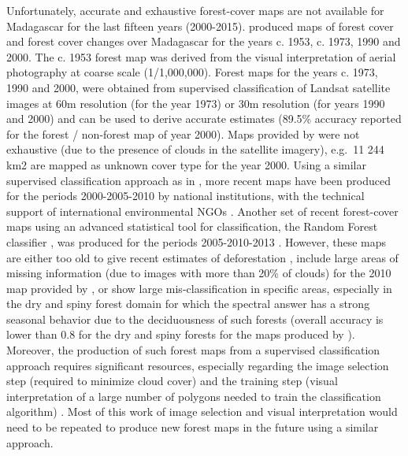 \documentclass[]{article}
\begin{document}
Unfortunately, accurate and exhaustive forest-cover maps are not
available for Madagascar for the last fifteen years (2000-2015).
\citet{Harper2007} produced maps of forest cover and forest cover
changes over Madagascar for the years c. 1953, c. 1973, 1990 and 2000.
The c. 1953 forest map was derived from the visual interpretation of
aerial photography at coarse scale (1/1,000,000). Forest maps for the
years c. 1973, 1990 and 2000, were obtained from supervised
classification of Landsat satellite images at 60m resolution (for the
year 1973) or 30m resolution (for years 1990 and 2000) and can be used
to derive accurate estimates (89.5\% accuracy reported for the forest /
non-forest map of year 2000). Maps provided by \citet{Harper2007} were
not exhaustive (due to the presence of clouds in the satellite imagery),
e.g.~11 244 km2 are mapped as unknown cover type for the year 2000.
Using a similar supervised classification approach as in
\citet{Harper2007}, more recent maps have been produced for the periods
2000-2005-2010 by national institutions, with the technical support of
international environmental NGOs \citep{MEFT2009, ONE2013}. Another set
of recent forest-cover maps using an advanced statistical tool for
classification, the Random Forest classifier
\citep{Grinand2013, Rakotomalala2015}, was produced for the periods
2005-2010-2013 \citep{ONE2015}. However, these maps are either too old
to give recent estimates of deforestation \citep{MEFT2009, ONE2013},
include large areas of missing information (due to images with more than
20\% of clouds) for the 2010 map provided by \citep{ONE2013}, or show
large mis-classification in specific areas, especially in the dry and
spiny forest domain for which the spectral answer has a strong seasonal
behavior due to the deciduousness of such forests (overall accuracy is
lower than 0.8 for the dry and spiny forests for the maps produced by
\citet{ONE2015}). Moreover, the production of such forest maps from a
supervised classification approach requires significant resources,
especially regarding the image selection step (required to minimize
cloud cover) and the training step (visual interpretation of a large
number of polygons needed to train the classification algorithm)
\citep{Rakotomalala2015}. Most of this work of image selection and
visual interpretation would need to be repeated to produce new forest
maps in the future using a similar approach.
\end{document}
